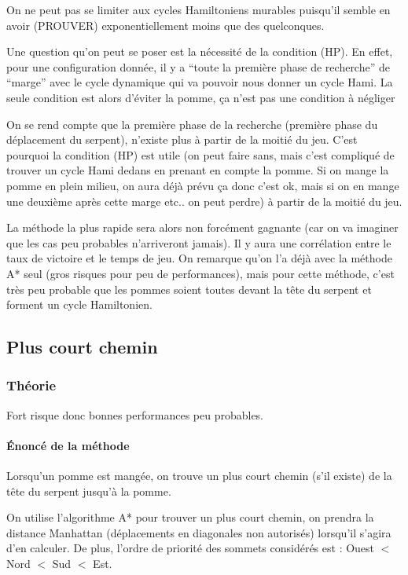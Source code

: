 \documentclass[french,a4paper]{article}
\begin{document}
On ne peut pas se limiter aux cycles Hamiltoniens murables puisqu'il semble en avoir (PROUVER) exponentiellement moins que des quelconques.

Une question qu'on peut se poser est la nécessité de la condition (HP). En effet, pour une configuration donnée, il y a ``toute la première phase de recherche'' de ``marge'' avec le cycle dynamique qui va pouvoir nous donner un cycle Hami. La seule condition est alors d'éviter la pomme, ça n'est pas une condition à négliger

On se rend compte que la première phase de la recherche (première phase du déplacement du serpent), n'existe plus à partir de la moitié du jeu. C'est pourquoi la condition (HP) est utile (on peut faire sans, mais c'est compliqué de trouver un cycle Hami dedans en prenant en compte la pomme. Si on mange la pomme en plein milieu, on aura déjà prévu ça donc c'est ok, mais si on en mange une deuxième après cette marge etc.. on peut perdre) à partir de la moitié du jeu.

La méthode la plus rapide sera alors non forcément gagnante (car on va imaginer que les cas peu probables n'arriveront jamais). Il y aura une corrélation entre le taux de victoire et le temps de jeu. On remarque qu'on l'a déjà avec la méthode A* seul (gros risques pour peu de performances), mais pour cette méthode, c'est très peu probable que les pommes soient toutes devant la tête du serpent et forment un cycle Hamiltonien.

\subsection{Plus court chemin}

\subsubsection{Théorie}

Fort risque donc bonnes performances peu probables.

\paragraph{Énoncé de la méthode}
Lorsqu'un pomme est mangée, on trouve un plus court chemin (s'il existe) de la tête du serpent jusqu'à la pomme.

On utilise l'algorithme A* pour trouver un plus court chemin, on prendra la distance Manhattan (déplacements en diagonales non autorisés) lorsqu'il s'agira d'en calculer. De plus, l'ordre de priorité des sommets considérés est : Ouest $<$ Nord $<$ Sud $<$ Est.
\end{document}
